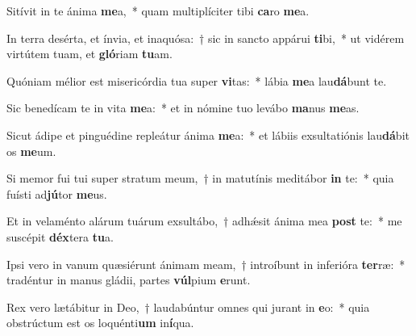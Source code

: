 \item Sitívit in te ánima \textbf{me}a,~* quam multiplíciter tibi \textbf{ca}ro \textbf{me}a.
\item In terra desérta, et ínvia, et inaquósa:~† sic in sancto appárui \textbf{ti}bi,~* ut vidérem virtútem tuam, et \textbf{gló}riam \textbf{tu}am.
\item Quóniam mélior est misericórdia tua super \textbf{vi}tas:~* lábia \textbf{me}a lau\textbf{dá}bunt te.
\item Sic benedícam te in vita \textbf{me}a:~* et in nómine tuo levábo \textbf{ma}nus \textbf{me}as.
\item Sicut ádipe et pinguédine repleátur ánima \textbf{me}a:~* et lábiis exsultatiónis lau\textbf{dá}bit os \textbf{me}um.
\item Si memor fui tui super stratum meum,~† in matutínis meditábor \textbf{in} te:~* quia fuísti ad\textbf{jú}tor \textbf{me}us.
\item Et in velaménto alárum tuárum exsultábo,~† adhǽsit ánima mea \textbf{post} te:~* me suscépit \textbf{déx}tera \textbf{tu}a.
\item Ipsi vero in vanum quæsiérunt ánimam meam,~† introíbunt in inferióra \textbf{ter}ræ:~* tradéntur in manus gládii, partes \textbf{vúl}pium \textbf{e}runt.
\item Rex vero lætábitur in Deo,~† laudabúntur omnes qui jurant in \textbf{e}o:~* quia obstrúctum est os loquénti\textbf{um} in\textbf{í}qua.
